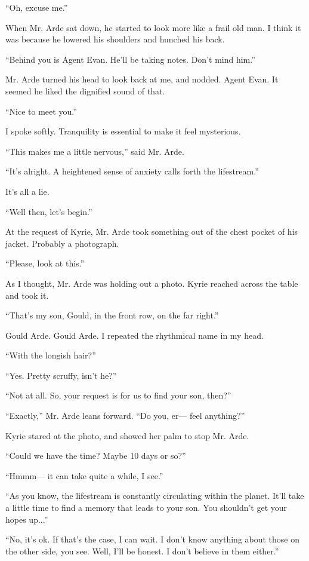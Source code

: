 \documentclass[oneside]{book}
\begin{document}
“Oh, excuse me.”

When Mr. Arde sat down, he started to look more like a frail old man. I think it was because he lowered his shoulders and hunched his back.

“Behind you is Agent Evan. He’ll be taking notes. Don’t mind him.”

Mr. Arde turned his head to look back at me, and nodded. Agent Evan. It seemed he liked the dignified sound of that.

“Nice to meet you.”

I spoke softly. Tranquility is essential to make it feel mysterious.

“This makes me a little nervous,” said Mr. Arde.

“It’s alright. A heightened sense of anxiety calls forth the lifestream.”

It’s all a lie.

“Well then, let’s begin.”

At the request of Kyrie, Mr. Arde took something out of the chest pocket of his jacket. Probably a photograph.

“Please, look at this.”

As I thought, Mr. Arde was holding out a photo. Kyrie reached across the table and took it.

“That’s my son, Gould, in the front row, on the far right.”

Gould Arde. Gould Arde. I repeated the rhythmical name in my head.

“With the longish hair?”

“Yes. Pretty scruffy, isn’t he?”

“Not at all. So, your request is for us to find your son, then?”

“Exactly,” Mr. Arde leans forward. “Do you, er— feel anything?”

Kyrie stared at the photo, and showed her palm to stop Mr. Arde.

“Could we have the time? Maybe 10 days or so?”

“Hmmm— it can take quite a while, I see.”

“As you know, the lifestream is constantly circulating within the planet. It’ll take a little time to find a memory that leads to your son. You shouldn’t get your hopes up...”

“No, it’s ok. If that’s the case, I can wait. I don’t know anything about those on the other side, you see. Well, I’ll be honest. I don’t believe in them either.”
\end{document}
